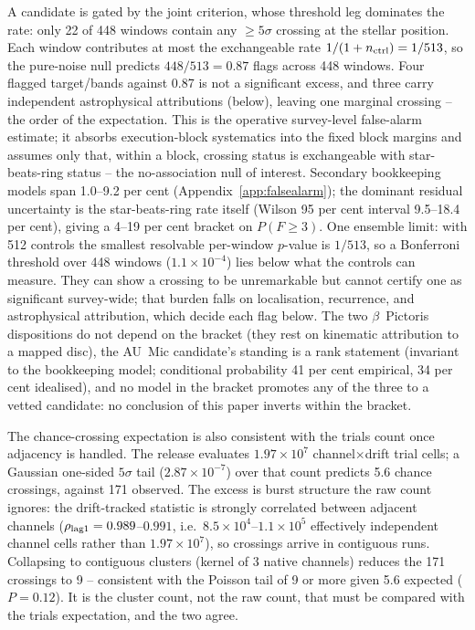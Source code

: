 \documentclass{openjournal}
\begin{document}
A candidate is gated by the joint criterion, whose threshold leg
dominates the rate: only 22 of 448 windows contain any $\geq5\sigma$
crossing at the stellar position. Each window contributes at most the
exchangeable rate $1/(1+n_{\rm ctrl})=1/513$, so the pure-noise null
predicts $448/513=0.87$ flags across 448 windows. Four flagged
target/bands against 0.87 is not a significant excess, and three
carry independent astrophysical attributions (below), leaving one
marginal crossing -- the order of the expectation. This is the
operative survey-level false-alarm estimate; it absorbs
execution-block systematics into the fixed block margins and assumes
only that, within a block, crossing status is exchangeable with
star-beats-ring status -- the no-association null of interest.
Secondary bookkeeping models span 1.0--9.2 per cent
(Appendix~\ref{app:falsealarm}); the dominant residual uncertainty is
the star-beats-ring rate itself (Wilson 95 per cent interval
9.5--18.4 per cent), giving a 4--19 per cent bracket on $P(F\geq3)$.
One ensemble limit: with 512 controls the smallest resolvable
per-window $p$-value is $1/513$, so a Bonferroni threshold over 448
windows ($1.1\times10^{-4}$) lies below what the controls can
measure. They can show a crossing to be unremarkable but cannot
certify one as significant survey-wide; that burden falls on
localisation, recurrence, and astrophysical attribution, which decide
each flag below. The two $\beta$~Pictoris dispositions do not depend
on the bracket (they rest on kinematic attribution to a mapped disc),
the AU~Mic candidate's standing is a rank statement (invariant to the
bookkeeping model; conditional probability 41 per cent empirical, 34
per cent idealised), and no model in the bracket promotes any of the
three to a vetted candidate: no conclusion of this paper inverts
within the bracket.

The chance-crossing expectation is also consistent with the trials
count once adjacency is handled. The release evaluates
$1.97\times10^{7}$ channel$\times$drift trial cells; a Gaussian
one-sided $5\sigma$ tail ($2.87\times10^{-7}$) over that count
predicts 5.6 chance crossings, against 171 observed. The excess is
burst structure the raw count ignores: the drift-tracked statistic is
strongly correlated between adjacent channels
($\rho_{\rm lag1}=0.989$--$0.991$, i.e.\
$8.5\times10^{4}$--$1.1\times10^{5}$ effectively independent channel
cells rather than $1.97\times10^{7}$), so crossings arrive in
contiguous runs. Collapsing to contiguous clusters (kernel of 3
native channels) reduces the 171 crossings to 9 -- consistent with
the Poisson tail of 9 or more given 5.6 expected ($P=0.12$). It is
the cluster count, not the raw count, that must be compared with the
trials expectation, and the two agree.
\end{document}
